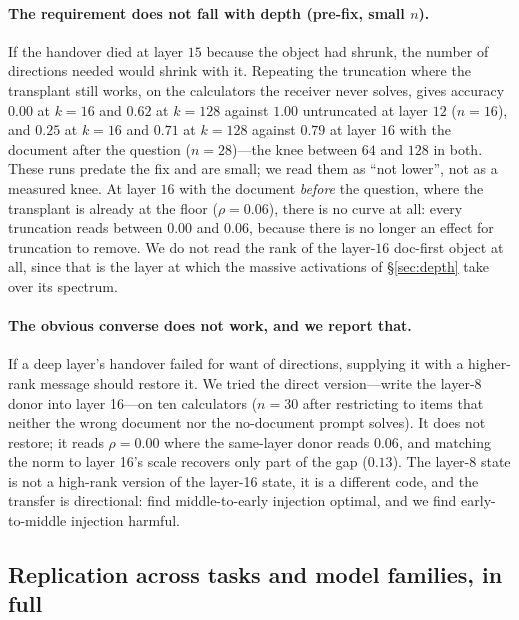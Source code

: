 \documentclass{article}
\begin{document}
\paragraph{The requirement does not fall with depth (pre-fix, small $n$).} If
the handover died at layer $15$ because the object had shrunk, the number of
directions needed would shrink with it. Repeating the truncation where the
transplant still works, on the calculators the receiver never solves, gives
accuracy $0.00$ at $k=16$ and $0.62$ at $k=128$ against $1.00$ untruncated at
layer $12$ ($n=16$), and $0.25$ at $k=16$ and $0.71$ at $k=128$ against $0.79$ at
layer $16$ with the document after the question ($n=28$)---the knee between $64$
and $128$ in both. These runs predate the fix and are small; we read them as
``not lower'', not as a measured knee. At layer $16$ with the document \emph{before} the question, where the
transplant is already at the floor ($\rho=0.06$), there is no curve at all:
every truncation reads between $0.00$ and $0.06$, because there is no longer an
effect for truncation to remove. We do not read the rank of the layer-$16$
doc-first object at all, since that is the layer at which the massive
activations of \S\ref{sec:depth} take over its spectrum.



\paragraph{The obvious converse does not work, and we report that.} If a deep
layer's handover failed for want of directions, supplying it with a higher-rank
message should restore it. We tried the direct version---write the layer-8
donor into layer 16---on ten calculators ($n=30$ after restricting to items that
neither the wrong document nor the no-document prompt solves). It does not
restore; it reads $\rho = 0.00$ where the same-layer donor reads $0.06$,
and matching the norm to layer 16's scale recovers only part of the gap
($0.13$). The layer-8 state is not a high-rank version of the layer-16 state, it
is a different code, and the transfer is directional:
\citet{ardoin2026promptcompression} find middle-to-early injection optimal, and
we find early-to-middle injection harmful.

\subsection{Replication across tasks and model families, in full}
\label{app:replication}
\end{document}
